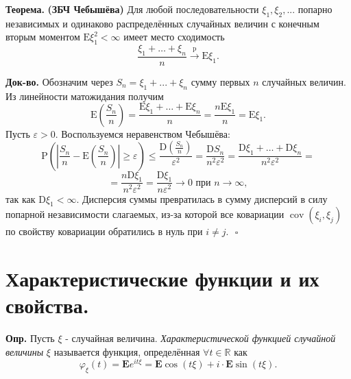 \documentclass[oneside,final,14pt]{extreport}
\newcommand\mydef{{\bf Опр.}}
\newcommand\myth{{\bf Теорема.}}
\newcommand\myqed{{\bf Док-во.}}
\theoremstyle{definition}
\begin{document}
\myth{} \textbf{(ЗБЧ Чебышёва)} Для любой последовательности $\xi_1, \xi_2, ...$ попарно независимых и одинаково распределённых случайных величин с конечным вторым моментом $\mathrm{E}\xi_1^2 < \infty$ имеет место сходимость
$$\frac{\xi_{1}+\ldots+\xi_{n}}{n} \stackrel{\mathrm{p}}{\longrightarrow} \mathrm{E} \xi_{1}.$$

\myqed{} Обозначим через $S_n = \xi_1 + ... + \xi_n$ сумму первых $n$ случайных величин. Из линейности матожидания получим
$$\mathrm{E}\left(\frac{S_{n}}{n}\right)=\frac{\mathrm{E} \xi_{1}+\ldots+\mathrm{E} \xi_{n}}{n}=\frac{n \mathrm{E} \xi_{1}}{n}=\mathrm{E} \xi_{1}.$$
Пусть $\varepsilon > 0.$ Воспользуемся неравенством Чебышёва:
$$\mathrm{P}\left(\left|\frac{S_{n}}{n}-\mathrm{E}\left(\frac{S_{n}}{n}\right)\right| \geqslant \varepsilon\right) \leqslant \frac{\mathrm{D}\left(\frac{S_{n}}{n}\right)}{\varepsilon^{2}}=\frac{\mathrm{D} S_{n}}{n^{2} \varepsilon^{2}}=\frac{\mathrm{D} \xi_{1}+\ldots+\mathrm{D} \xi_{n}}{n^{2} \varepsilon^{2}}=$$$$=\frac{n \mathrm{D} \xi_{1}}{n^{2} \varepsilon^{2}}=\frac{\mathrm{D} \xi_{1}}{n \varepsilon^{2}} \rightarrow 0 \text { при } n \rightarrow \infty,$$
так как $\mathrm{D}\xi_1 < \infty$. Дисперсия суммы превратилась в сумму дисперсий в силу попарной независимости слагаемых, из-за которой все ковариации $\operatorname{cov}(\xi_i, \xi_j)$ по свойству ковариации обратились в нуль при $i \neq j. ~~~ \square$

\section{Характеристические функции и их свойства.}

\mydef{} Пусть $\xi$ - случайная величина. {\it Характеристической функцией случайной величины} $\xi$ называется функция, определённая $\forall t \in \mathbb{R}$ как
$$\varphi_{\xi}(t)=\mathbf{E} e^{i t \xi}=\mathbf{E} \cos (t \xi)+i \cdot \mathbf{E} \sin (t \xi).$$
\end{document}

